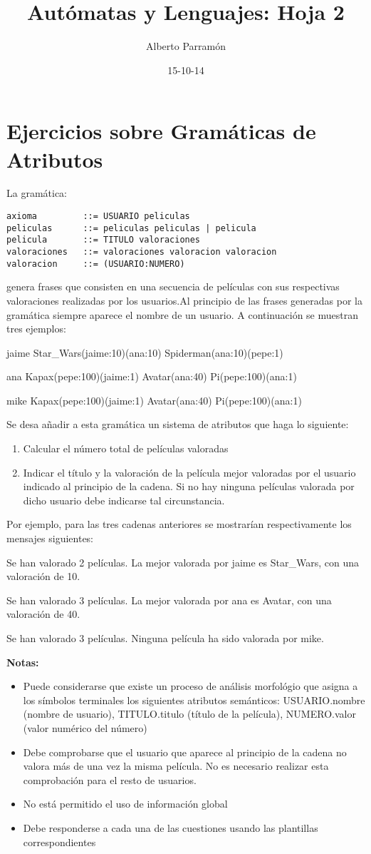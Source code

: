 \documentclass[nochap]{apuntes}
\title{Autómatas y Lenguajes: Hoja 2}
\author{Alberto Parramón}
\date{15-10-14}
\begin{document}
\pagestyle{plain}

\section{Ejercicios sobre Gramáticas de Atributos}
La gramática:
\begin{verbatim}
axioma         ::= USUARIO peliculas
peliculas      ::= peliculas peliculas | pelicula
pelicula       ::= TITULO valoraciones
valoraciones   ::= valoraciones valoracion valoracion
valoracion     ::= (USUARIO:NUMERO)
\end{verbatim}
genera frases que consisten en una secuencia de películas con sus respectivas valoraciones realizadas por los usuarios.Al principio de las frases generadas por la
gramática siempre aparece el nombre de un usuario. A continuación se muestran tres ejemplos:

jaime Star\_Wars(jaime:10)(ana:10) Spiderman(ana:10)(pepe:1)

ana Kapax(pepe:100)(jaime:1) Avatar(ana:40) Pi(pepe:100)(ana:1)

mike Kapax(pepe:100)(jaime:1) Avatar(ana:40) Pi(pepe:100)(ana:1)


Se desa añadir a esta gramática un sistema de atributos que haga lo siguiente:
\begin{enumerate}
\item Calcular el número total de películas valoradas
\item Indicar el título y la valoración de la película mejor valoradas por el usuario indicado al principio de la cadena. Si no hay ninguna películas valorada por dicho usuario debe indicarse tal circunstancia.
\end{enumerate}

Por ejemplo, para las tres cadenas anteriores se mostrarían respectivamente los mensajes siguientes:

Se han valorado 2 películas.
La mejor valorada por jaime es Star\_Wars, con una valoración de 10.

Se han valorado 3 películas.
La mejor valorada por ana es Avatar, con una valoración de 40.

Se han valorado 3 películas.
Ninguna película ha sido valorada por mike.


\textbf{Notas:}
\begin{itemize}
\item Puede considerarse que existe un proceso de análisis morfológio que asigna a los símbolos terminales los siguientes atributos semánticos: USUARIO.nombre (nombre de usuario), TITULO.titulo (título de la película), NUMERO.valor (valor numérico del número)
\item Debe comprobarse que el usuario que aparece al principio de la cadena no valora más de una vez la misma película. No es necesario realizar esta comprobación para el resto de usuarios.
\item No está permitido el uso de información global
\item Debe responderse a cada una de las cuestiones usando las plantillas correspondientes
\end{itemize}
\newpage
\end{document}
